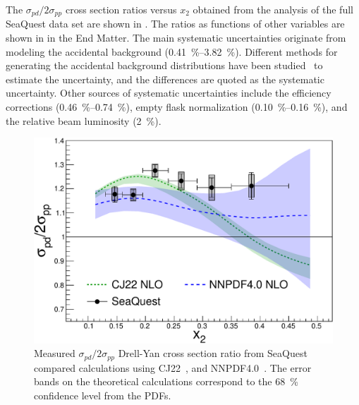 \documentclass[reprint,aps,unsortedaddress,superscriptaddress,prl,floatfix,showpacs,linenumbers]{revtex4-2}
\begin{document}
The $\sigma_{pd}/2\sigma_{pp}$ cross
section ratios versus $x_2$ obtained from the analysis of the full SeaQuest
data set are shown in . 
The ratios as functions of other variables are shown in  in the End Matter.
The main systematic uncertainties originate from modeling the
accidental background (\qtyrange{0.41}{3.82}{\percent}).
Different methods for generating the accidental background distributions
have been studied~\cite{pate2023} to estimate the uncertainty,
and the differences are quoted as the systematic uncertainty.
Other sources of systematic uncertainties include the efficiency
corrections (\qtyrange{0.46}{0.74}{\percent}),
empty flask normalization (\qtyrange{0.10}{0.16}{\percent}), and the
relative beam luminosity (\SI{2}{\percent}).

\begin{figure}[htbp!]
	\centering
	\includegraphics[width=\linewidth]{data_full_xT_syst.pdf}
	\caption{Measured $\sigma_{pd}/2\sigma_{pp}$ Drell-Yan cross section ratio from SeaQuest compared calculations using
		 CJ22~\cite{accardi2023}, and NNPDF4.0~\cite{ball2022a}.
		The error bands on the theoretical calculations correspond to the \SI{68}{\percent} confidence level from the PDFs.}
	\label{fig:xT_csr}
\end{figure}
\end{document}
